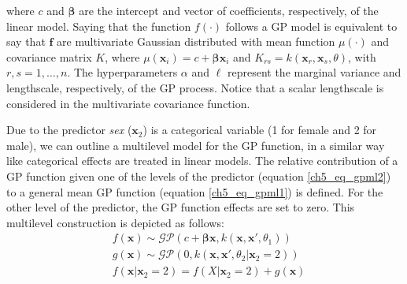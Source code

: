 \documentclass[onecolumn,a4paper,11pt]{article}
\begin{document}
\noindent where $c$ and $\bm{\beta}$ are the intercept and vector of coefficients, respectively, of the linear model.  Saying that the function $f(\cdot)$ follows a GP model is equivalent to say that $\bm{f}$ are multivariate Gaussian distributed with mean function $\mu(\cdot)$ and covariance matrix $K$, where $\mu(\bm{x}_i)=c + \bm{\beta}\bm{x}_i$ and $K_{rs}=k(\bm{x}_r,\bm{x}_s,\theta)$, with $r,s=1,\dots,n$.  The hyperparameters $\alpha$ and $\ell$ represent the marginal variance and lengthscale, respectively, of the GP process. Notice that a scalar lengthscale is considered in the multivariate covariance function.


Due to the predictor \textit{sex} ($\bm{x}_2$) is a categorical variable (1 for female and 2 for male), we can outline a multilevel model for the GP function, in a similar way like categorical effects are treated in linear models. The relative contribution of a GP function given one of the levels of the predictor (equation \ref{ch5_eq_gpml2}) to a general mean GP function (equation \ref{ch5_eq_gpml1}) is defined. For the other level of the predictor, the GP function effects are set to zero. This multilevel construction is depicted as follows:
%
\begin{eqnarray} 
&f(\bm{x}) \sim \mathcal{GP}(c + \bm{\beta}\bm{x}, k(\bm{x},\bm{x}', \theta_1)) \label{ch5_eq_gpml1} \\
&g(\bm{x}) \sim \mathcal{GP}(0, k(\bm{x},\bm{x}', \theta_2|\bm{x}_2=2)) \label{ch5_eq_gpml2} \\ 
&f(\bm{x}|\bm{x}_2=2) = f(X|\bm{x}_2=2) + g(\bm{x}) \nonumber
\end{eqnarray}
\end{document}
